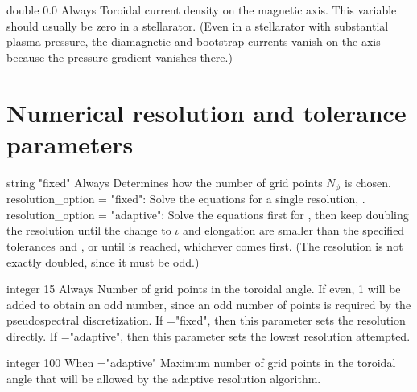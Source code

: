 \myhrule

{double}
{0.0}
{Always}
{Toroidal current density on the magnetic axis. This variable should usually be zero in a stellarator.  (Even in a stellarator with substantial plasma pressure, the diamagnetic and bootstrap currents vanish on the axis because the pressure gradient vanishes there.)}

\myhrule


\section{Numerical resolution and tolerance parameters}

{string}
{{\ttfamily "fixed"}}
{Always}
{Determines how the number of grid points $N_{\phi}$ is chosen.\\

{\ttfamily resolution\_option} = {\ttfamily "fixed"}: Solve the equations for a single resolution, .\\

{\ttfamily resolution\_option} = {\ttfamily "adaptive"}: Solve the equations first for , then keep doubling the resolution until the change to $\iota$ and elongation are smaller than the specified tolerances  and , or until  is reached, whichever comes first. (The resolution is not exactly doubled, since it must be odd.)\\

}

\myhrule

{integer}
{15}
{Always}
{Number of grid points in the toroidal angle. If even, 1 will be added to obtain an odd number, since an odd number of points is required by the pseudospectral discretization. If ={\ttfamily "fixed"}, then this parameter sets the resolution directly. If ={\ttfamily "adaptive"}, then this parameter sets the lowest resolution attempted.}

\myhrule

{integer}
{100}
{When ={\ttfamily "adaptive"}}
{Maximum number of grid points in the toroidal angle that will be allowed by the adaptive resolution algorithm.}

